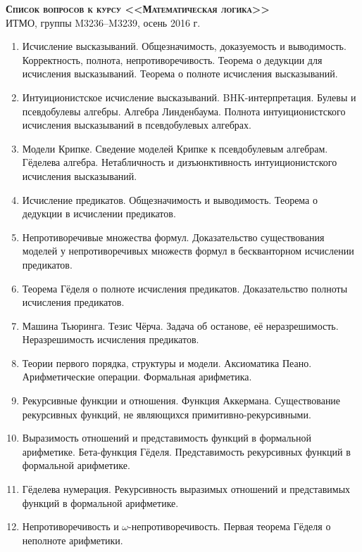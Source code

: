\documentclass[11pt,a4paper,oneside]{scrartcl}
\begin{document}
\pagestyle{empty}

\begin{center}
{\large\scshape\bfseries Список вопросов к курсу <<Математическая логика>>}\\
ИТМО, группы M3236--M3239, осень 2016 г.
\end{center}


\begin{enumerate}
\item Исчисление высказываний. Общезначимость, доказуемость и выводимость. Корректность, полнота, непротиворечивость.
Теорема о дедукции для исчисления высказываний.
Теорема о полноте исчисления высказываний.
\item Интуиционистское исчисление высказываний. BHK-интерпретация. Булевы и псевдобулевы алгебры.
Алгебра Линденбаума. Полнота интуиционистского исчисления высказываний в псевдобулевых алгебрах.
\item Модели Крипке. Сведение моделей Крипке к псевдобулевым алгебрам. 
Гёделева алгебра. Нетабличность и дизъюнктивность интуиционистского исчисления высказываний.
\item Исчисление предикатов. Общезначимость и выводимость. Теорема о дедукции в исчислении предикатов.
\item Непротиворечивые множества формул. Доказательство существования моделей у непротиворечивых множеств формул 
в бескванторном исчислении предикатов.
\item Теорема Гёделя о полноте исчисления предикатов. Доказательство полноты исчисления предикатов.
\item Машина Тьюринга. Тезис Чёрча. Задача об останове, её неразрешимость. Неразрешимость исчисления предикатов.
\item Теории первого порядка, структуры и модели. Аксиоматика Пеано. Арифметические операции. Формальная арифметика. 
\item Рекурсивные функции и отношения. Функция Аккермана. Существование рекурсивных функций,
не являющихся примитивно-рекурсивными. 
\item Выразимость отношений и представимость функций в формальной арифметике. Бета-функция Гёделя. 
Представимость рекурсивных функций в формальной арифметике.
\item Гёделева нумерация. Рекурсивность выразимых отношений и представимых функций в формальной арифметике.
\item Непротиворечивость и $\omega$-непротиворечивость. Первая теорема Гёделя о неполноте арифметики.

\end{enumerate}
\end{document}
